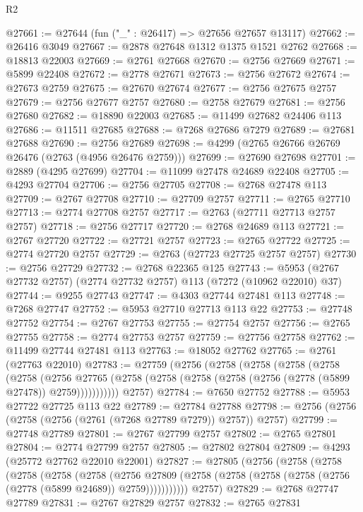 \begin{lexlean}{R2}
\begin{coremodule}
@27661 := @27644 (fun ("_" : @26417) => @27656 @27657 @13117)
@27662 := @26416 @3049
@27667 := @2878 @27648 @1312 @1375 @1521 @2762
@27668 := @18813 @22003
@27669 := @2761 @27668
@27670 := @2756 @27669
@27671 := @5899 @22408
@27672 := @2778 @27671
@27673 := @2756 @27672
@27674 := @27673 @2759
@27675 := @27670 @27674
@27677 := @2756 @27675 @2757
@27679 := @2756 @27677 @2757
@27680 := @2758 @27679
@27681 := @2756 @27680
@27682 := @18890 @22003
@27685 := @11499 @27682 @24406 @113
@27686 := @11511 @27685
@27688 := @7268 @27686 @7279
@27689 := @27681 @27688
@27690 := @2756 @27689
@27698 := @4299 (@2765 @26766 @26769 @26476 (@2763 (@4956 @26476 @2759)))
@27699 := @27690 @27698
@27701 := @2889 (@4295 @27699)
@27704 := @11099 @27478 @24689 @22408
@27705 := @4293 @27704
@27706 := @2756 @27705
@27708 := @2768 @27478 @113
@27709 := @2767 @27708
@27710 := @27709 @2757
@27711 := @2765 @27710
@27713 := @2774 @27708 @2757
@27717 := @2763 (@27711 @27713 @2757 @2757)
@27718 := @2756 @27717
@27720 := @2768 @24689 @113
@27721 := @2767 @27720
@27722 := @27721 @2757
@27723 := @2765 @27722
@27725 := @2774 @27720 @2757
@27729 := @2763 (@27723 @27725 @2757 @2757)
@27730 := @2756 @27729
@27732 := @2768 @22365 @125
@27743 := @5953 (@2767 @27732 @2757) (@2774 @27732 @2757) @113 (@7272 (@10962 @22010) @37)
@27744 := @9255 @27743
@27747 := @4303 @27744 @27481 @113
@27748 := @7268 @27747
@27752 := @5953 @27710 @27713 @113 @22
@27753 := @27748 @27752
@27754 := @2767 @27753
@27755 := @27754 @2757
@27756 := @2765 @27755
@27758 := @2774 @27753 @2757
@27759 := @27756 @27758
@27762 := @11499 @27744 @27481 @113
@27763 := @18052 @27762
@27765 := @2761 (@27763 @22010)
@27783 := @27759
    (@2756
      (@2758
        (@2758
          (@2758
            (@2758
              (@2758
                (@2756
                  @27765
                  (@2758 (@2758 (@2758 (@2758 (@2756 (@2778 (@5899 @27478)) @2759)))))))))))
      @2757)
@27784 := @7650 @27752
@27788 := @5953 @27722 @27725 @113 @22
@27789 := @27784 @27788
@27798 := @2756 (@2756 (@2758 (@2756 (@2761 (@7268 @27789 @7279)) @2757)) @2757)
@27799 := @27748 @27789
@27801 := @2767 @27799 @2757
@27802 := @2765 @27801
@27804 := @2774 @27799 @2757
@27805 := @27802 @27804
@27809 := @4293 (@25772 @27762 @22010 @22001)
@27827 := @27805
    (@2756
      (@2758
        (@2758
          (@2758
            (@2758
              (@2758
                (@2756
                  @27809
                  (@2758 (@2758 (@2758 (@2758 (@2756 (@2778 (@5899 @24689)) @2759)))))))))))
      @2757)
@27829 := @2768 @27747 @27789
@27831 := @2767 @27829 @2757
@27832 := @2765 @27831

\end{coremodule}
\end{lexlean}
